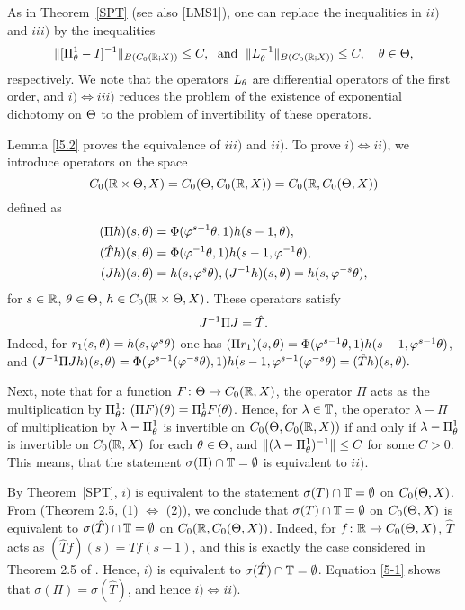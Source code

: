 As in Theorem~\ref{SPT} (see also [LMS1]), one
can replace the inequalities in $ii)$ and $iii)$ by the
inequalities
$$
\|[\Pi^1_\theta-I]^{-1}\|_{B(C_{0}({\Bbb{R}};X))} \le C,\;\text{ and }\;
\|L^{-1}_\theta \|_{B(C_{0}({\Bbb{R}}; X))} \le C, \quad \theta\in \Theta,
$$
respectively. We note that the operators $L_\theta$ are
differential operators of the first order, and
$i)\Leftrightarrow iii)$ reduces the problem of the existence of
exponential dichotomy on $\Theta$ to the problem of invertibility
of these operators.

\begin{pf} Lemma \ref{l5.2} proves the equivalence of
$iii)$ and $ii)$. To prove $i) \Leftrightarrow ii)$, we
introduce operators on the space
$$
C_0({\Bbb{R}}\times \Theta,X) = C_0(\Theta,C_0({\Bbb{R}},X)) = C_0({\Bbb{R}},C_0(\Theta,X))
$$
defined as
$$\begin{aligned}
(\Pi h)(s,\theta) & = \Phi(\varphi^{s-1}\theta, 1) h(s-1, \theta),\\
(\hat{T}h)(s,\theta) & = \Phi(\varphi^{-1}\theta,1) h(s-1,\varphi^{-1}\theta),\\
(Jh)(s,\theta) & = h(s,\varphi^s\theta),
(J^{-1}h)(s,\theta) = h (s,\varphi^{-s}\theta),
\end{aligned}$$
for $s\in{\Bbb{R}}$, $\theta\in \Theta$, $h\in C_0({\Bbb{R}}\times \Theta,X)$.
These operators satisfy
\begin{equation}\lb{5-1}
J^{-1} \Pi J=\hat{T}.
\end{equation}
Indeed, for $r_1(s,\theta) = h(s,\varphi^s\theta)$ one has $(\Pi r_1) (s,\theta) =
\Phi(\varphi^{s-1}\theta,1) h(s-1,\varphi^{s-1}\theta)$, and $(J^{-1}\Pi J h)
(s,\theta) = \Phi (\varphi^{s-1} (\varphi^{-s} \theta), 1)h(s-1,\varphi^{s-1}
(\varphi^{-s}\theta) = (\hat{T}h)(s,\theta).$

Next, note that for a function $F\colon \Theta\to C_0({\Bbb{R}}, X)$, the
operator $\Pi$ acts as the multiplication by $\Pi_\theta^1$:
$(\Pi F)(\theta) = \Pi_\theta^1F(\theta)$.  Hence,
for $\lambda\in{\Bbb{T}}$, the operator $\lambda-\Pi$ of multiplication
by $\lambda-\Pi^1_\theta$ is invertible on $C_0(\Theta,C_0({\Bbb{R}},X))$ if
and only if $\lambda-\Pi^1_\theta$ is invertible on $C_0({\Bbb{R}},X)$ for
each $\theta\in \Theta$, and $\|(\lambda-\Pi^1_\theta)^{-1}\|\le C$ for some
$C>0$. This means, that the
statement $\sigma (\Pi) \cap {\Bbb{T}} = \emptyset$ is equivalent to
$ii)$.

By Theorem~\ref{SPT}, $i)$ is equivalent to the statement $\sigma
({T})\cap{\Bbb{T}} = \emptyset$ on $C_0(\Theta,X)$. From \cite{LMS1} (Theorem 2.5, (1)
$\Leftrightarrow$ (2)), we conclude that $\sigma ({T})\cap{\Bbb{T}} =
\emptyset$ on $C_0(\Theta,X)$ is equivalent to
$\sigma (\hat{T})\cap{\Bbb{T}} = \emptyset$ on $C_0({\Bbb{R}},C_0(\Theta,X))$.  Indeed,
for $f\colon{\Bbb{R}}\to C_0(\Theta,X)$, $\hat{T}$ acts as $(\hat{T} f) (s) =
Tf(s-1)$, and this is exactly the case considered in Theorem 2.5 of
\cite{LMS1}. Hence, $i)$ is equivalent to $\sigma (\hat{T})\cap{\Bbb{T}} =
\emptyset$.  Equation \eqref{5-1} shows that
$\sigma(\Pi) = \sigma(\hat{T})$, and hence $i)\Leftrightarrow ii)$.
\end{pf}

